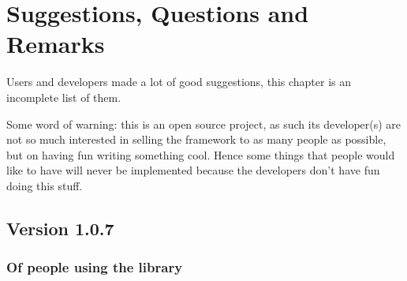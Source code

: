 \section{Suggestions, Questions and Remarks} \label{sec:suggestions}
Users and developers made a lot of good suggestions, this chapter is an incomplete list of them.

Some word of warning: this is an open source project, as such its developer(s) are not so much interested in selling the framework to as many people as possible, but on having fun writing something cool. Hence some things that people would like to have will never be implemented because the developers don't have fun doing this stuff. 

\subsection{Version 1.0.7}

\subsubsection{Of people using the library}


